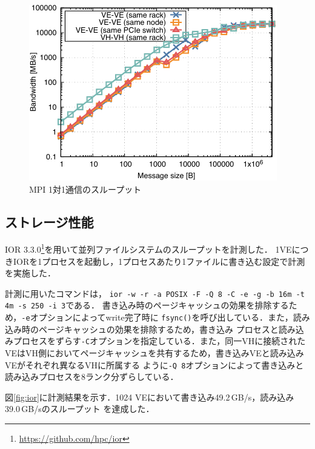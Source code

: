 ﻿\documentclass[submit,techrep,noauthor]{ipsj}
\begin{document}
\begin{figure}
  \centering
  \includegraphics{figs/mpi_bandwidth.pdf}
  \caption{MPI 1対1通信のスループット}\label{fig:bw}
\end{figure}


\subsection{ストレージ性能}\label{sec:storage}

IOR 3.3.0\footnote{\url{https://github.com/hpc/ior}}を用いて並列ファイルシステムのスループットを計測した．
1VEにつきIORを1プロセスを起動し，1プロセスあたり1ファイルに書き込む設定で計測を実施した．

計測に用いたコマンドは，
\texttt{ior -w -r -a POSIX -F -Q 8 -C -e -g -b 16m -t 4m -s 250 -i 3}である．
書き込み時のページキャッシュの効果を排除するため，\texttt{-e}オプションによってwrite完了時に
\texttt{fsync()}を呼び出している．また，読み込み時のページキャッシュの効果を排除するため，書き込み
プロセスと読み込みプロセスをずらす\texttt{-C}オプションを指定している．また，同一VHに接続された
VEはVH側においてページキャッシュを共有するため，書き込みVEと読み込みVEがそれぞれ異なるVHに所属する
ように\texttt{-Q 8}オプションによって書き込みと読み込みプロセスを8ランク分ずらしている．

図\ref{fig:ior}に計測結果を示す．1024 VEにおいて書き込み49.2\,GB/s，読み込み39.0\,GB/sのスループット
を達成した．
\end{document}
